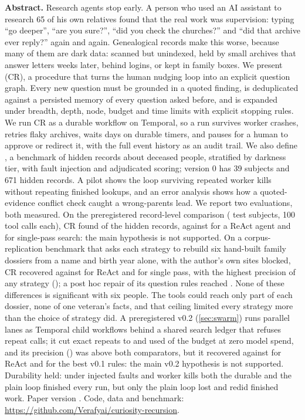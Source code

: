 \begin{center}\begin{minipage}{0.86\textwidth}\small\textbf{Abstract.} Research agents stop early. A person who used an AI assistant to research 65 of his own relatives found that the real work was supervision: typing ``go deeper'', ``are you sure?'', ``did you check the churches?'' and ``did that archive ever reply?'' again and again. Genealogical records make this worse, because many of them are dark data: scanned but unindexed, held by small archives that answer letters weeks later, behind logins, or kept in family boxes. We present \emph{\CR} (CR), a procedure that turns the human nudging loop into an explicit question graph. Every new question must be grounded in a quoted finding, is deduplicated against a persisted memory of every question asked before, and is expanded under breadth, depth, node, budget and time limits with explicit stopping rules. We run CR as a durable workflow on Temporal, so a run survives worker crashes, retries flaky archives, waits days on durable timers, and pauses for a human to approve or redirect it, with the full event history as an audit trail. We also define \emph{\bench}, a benchmark of hidden records about deceased people, stratified by darkness tier, with fault injection and adjudicated scoring; version 0 has 39 subjects and 671 hidden records. A pilot shows the loop surviving repeated worker kills without repeating finished lookups, and an error analysis shows how a quoted-evidence conflict check caught a wrong-parents lead. We report two evaluations, both measured. On the preregistered record-level comparison ( test subjects, 100 tool calls each), CR found  of the hidden records, against  for a ReAct agent and  for single-pass search: the main hypothesis is not supported. On a corpus-replication benchmark that asks each strategy to rebuild six hand-built family dossiers from a name and birth year alone, with the author's own sites blocked, CR recovered  against  for ReAct and  for single pass, with the highest precision of any strategy (); a post hoc repair of its question rules reached . None of these differences is significant with six people. The tools could reach only part of each dossier, none of one veteran's facts, and that ceiling limited every strategy more than the choice of strategy did. A preregistered v0.2 (\cref{sec:swarm}) runs parallel lanes as Temporal child workflows behind a shared search ledger that refuses repeat calls; it cut exact repeats to  and used  of the budget at zero model spend, and its precision () was above both comparators, but it recovered  against  for ReAct and  for the best v0.1 rules: the main v0.2 hypothesis is not supported. Durability held: under injected faults and worker kills both the durable and the plain loop finished every run, but only the plain loop lost and redid finished work. Paper version \paperversion. Code, data and benchmark: \url{https://github.com/Verafyai/curiosity-recursion}.
\end{minipage}\end{center}
